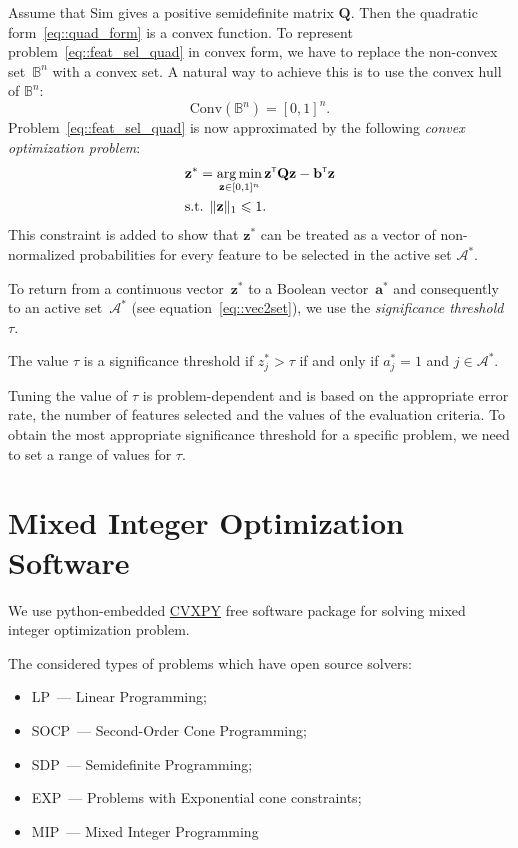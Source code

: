 \documentclass[a4paper,12pt]{article}
\renewcommand{\leq}{\ensuremath{\leqslant}}
\theoremstyle{plain} %
\theoremstyle{definition} %
\theoremstyle{remark} %
\newcommand{\cA}{\mathcal{A}}
\newcommand{\T}{{\text{\tiny\sffamily\upshape\mdseries T}}}
\newcommand{\argmin}{\mathop{\arg \min}\limits}
\begin{document}
	 Assume that Sim gives a positive semidefinite matrix $\mathbf{Q}$. 
	 Then the quadratic form~\eqref{eq::quad_form} is a convex function.
	 To represent problem~\eqref{eq::feat_sel_quad} in convex form, we have to replace the non-convex set~$\mathbb{B}^n$ with a convex set.
	 A natural way to achieve this is to use the convex hull of $\mathbb{B}^n$:
	 \[
	 \text{Conv}(\mathbb{B}^n) = [0, 1]^n.
	 \] 
	 Problem~\eqref{eq::feat_sel_quad} is now approximated by the following \emph{convex optimization problem}:
	 \begin{equation}
	 \begin{split}
	 & \mathbf{z}^* = \argmin_{\mathbf{z} \in [0, 1]^n} \mathbf{z}^{\T}\mathbf{Q}\mathbf{z} - \mathbf{b}^{\T}\mathbf{z}\\
	 &\text{s.t. } \| \mathbf{z} \|_1 \leq 1. 
	 \end{split}
	 \label{eq::feat_sel_quad_convex}
	 \end{equation}
	 This constraint is added to show that $\mathbf{z}^*$ can be treated as a vector of non-normalized probabilities for every feature to be selected in the active set $\cA^*$.
	 
	 To return from a continuous vector~$\mathbf{z}^*$ to a Boolean vector~$\mathbf{a}^*$ and consequently to an active set~$\cA^*$ (see equation~\eqref{eq::vec2set}), we use the \emph{significance threshold}~$\tau$.
	 
	 The value $\tau$ is a significance threshold if $z^*_j > \tau$ if and only if $a^*_j = 1$ and $j \in \cA^*$.
	 	
	 Tuning the value of $\tau$ is problem-dependent and is based on the appropriate error rate, the number of features selected and the values of the evaluation criteria.
	 To obtain the most appropriate significance threshold for a specific problem, we need to set a range of values for $\tau$.
	 
	\section*{Mixed Integer Optimization Software}
	We use python-embedded \href{http://cvxpy.org}{CVXPY} free software package for solving mixed integer optimization problem.
	
	The considered types of problems which have open source solvers:
	\begin{itemize}
		\item 
		LP~--- Linear Programming; 
		\item
		SOCP~--- Second-Order Cone Programming; 
		\item
		SDP~--- Semidefinite Programming; 
		\item
		EXP~--- Problems with Exponential cone constraints;
		\item
		MIP~--- Mixed Integer Programming
	\end{itemize}
\end{document}
